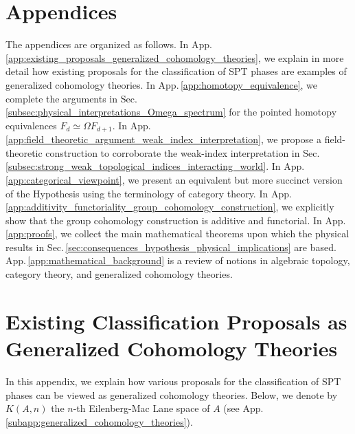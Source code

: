 \documentclass[sort&compress]{elsarticle}
\theoremstyle{theoremstyle}
\theoremstyle{framedtheoremstyle}
\theoremstyle{definitionstyle}
\theoremstyle{definitionstyle}
\theoremstyle{definitionstyle}
\theoremstyle{definitionstyle}
\theoremstyle{nameddefinitionstyle}
\theoremstyle{framednameddefinitionstyle}
\theoremstyle{proofstyle}
\theoremstyle{definitionstyle}
\newcommand{\homotopic}{\simeq}
\begin{document}
\begin{appendices}

\renewcommand{\appendixname}{\empty}

\section*{Appendices}

The appendices are organized as follows.
In App.\,\ref{app:existing_proposals_generalized_cohomology_theories}, we explain in more detail how existing proposals for the classification of SPT phases are examples of generalized cohomology theories.
In App.\,\ref{app:homotopy_equivalence}, we complete the arguments in Sec.\,\ref{subsec:physical_interpretations_Omega_spectrum} for the pointed homotopy equivalences $F_d \homotopic \Omega F_{d+1}$. 
In App.\,\ref{app:field_theoretic_argument_weak_index_interpretation}, we propose a field-theoretic construction to corroborate the weak-index interpretation in Sec.\,\ref{subsec:strong_weak_topological_indices_interacting_world}.
In App.\,\ref{app:categorical_viewpoint}, we present an equivalent but more succinct version of the Hypothesis using the terminology of category theory.
In App.\,\ref{app:additivity_functoriality_group_cohomology_construction}, we explicitly show that the group cohomology construction \cite{Wen_Boson} is additive and functorial.
In App.\,\ref{app:proofs}, we collect the main mathematical theorems upon which the physical results in Sec.\,\ref{sec:consequences_hypothesis_physical_implications} are based.
App.\,\ref{app:mathematical_background} is a review of notions in algebraic topology, category theory, and generalized cohomology theories.












\section{Existing Classification Proposals as Generalized Cohomology Theories\label{app:existing_proposals_generalized_cohomology_theories}}

In this appendix, we explain how various proposals for the classification of SPT phases can be viewed as generalized cohomology theories. Below, we denote by $K(A, n)$ the $n$-th Eilenberg-Mac Lane space of $A$ (see App.\,\ref{subapp:generalized_cohomology_theories}).






\end{appendices}
\end{document}
